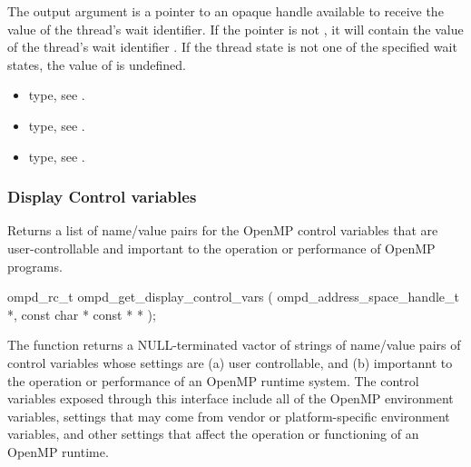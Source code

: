 The output argument  is a pointer to an opaque handle available to receive the value 
of the thread's wait identifier. If the  pointer is not , it will contain
the value of the thread's wait identifier . If the thread state is not one of the 
specified wait states, the value of  is undefined.


\crossreferences
\begin{itemize}
	\item {} type, see .
	\item {} type, see .
	\item {} type, see .
\end{itemize}



\subsubsection{Display Control variables}

\label{subsubsubsec:ompd_get_display_control_vars}
\summary
Returns a list of name/value pairs for the OpenMP control variables
that are user-controllable and important to the operation or
performance of OpenMP programs.
\format
\begin{cspecific}
\begin{ompSyntax}
ompd_rc_t ompd_get_display_control_vars (
  ompd_address_space_handle_t *,
  const char * const * *
);
\end{ompSyntax}
\end{cspecific}

\descr
The function  returns a
NULL-terminated vactor of strings of name/value pairs of control
variables whose settings are (a) user controllable,
and (b) importannt to the operation or performance of an OpenMP
runtime system.
The control variables exposed through this interface include all
of the OpenMP environment variables, settings that may come from
vendor or platform-specific environment variables, and other
settings that affect the operation or functioning of an OpenMP
runtime.

